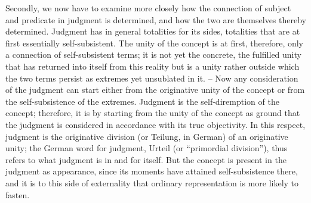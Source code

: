 Secondly, we now have to examine more closely how the connection of
subject and predicate in judgment is determined, and how the two are
themselves thereby determined. Judgment has in general totalities for its
sides, totalities that are at first essentially self-subsistent. The unity of the
concept is at first, therefore, only a connection of self-subsistent terms; it is
not yet the concrete, the fulfilled unity that has returned into itself from this
reality but is a unity rather outside which the two terms persist as extremes
yet unsublated in it. – Now any consideration of the judgment can start
either from the originative unity of the concept or from the self-subsistence
of the extremes. Judgment is the self-diremption of the concept; therefore,
it is by starting from the unity of the concept as ground that the judgment is
considered in accordance with its true objectivity. In this respect, judgment
is the originative division (or Teilung, in German) of an originative unity; the
German word for judgment, Urteil (or “primordial division”), thus refers
to what judgment is in and for itself. But the concept is present in the
judgment as appearance, since its moments have attained self-subsistence
there, and it is to this side of externality that ordinary representation is more
likely to fasten.

